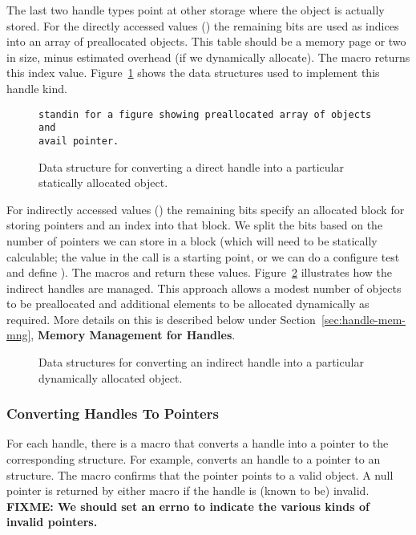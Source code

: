 \documentclass{article}
\def\fixme#1{\marginpar{FIXME:}\textbf{FIXME: #1}}
\begin{document}
The last two handle types point at other storage where the object is
actually stored.
For the directly accessed values () the
remaining bits are used as indices into 
an array of preallocated objects.
This table should be 
a memory page or two in size, 
minus estimated  overhead (if we dynamically allocate).
The macro  returns this index value.
Figure~\ref{fig:handle-direct} shows the data structures used to
implement this handle kind.

\begin{figure}
\begin{verbatim}
standin for a figure showing preallocated array of objects and
avail pointer.
\end{verbatim}
\caption{Data structure for converting a direct handle into a
particular statically allocated object.}
\label{fig:handle-direct}
\end{figure}

For indirectly accessed values () the
remaining bits specify an allocated block 
for storing pointers and an index into that block.  We split the bits
based on the number of pointers we can store in a block (which will need
to be statically calculable; the  value in the
 call is a starting point, or we can  do a configure test and
define ). 
The macros  and 
return these values.
Figure~\ref{fig:indirect} illustrates how the indirect handles are managed.
This approach allows a modest number of objects to be preallocated and
additional elements to be allocated dynamically as required.  More
details on this is described below under
Section~\ref{sec:handle-mem-mng}, \textbf{Memory Management for 
Handles}. 

\begin{figure}
\centerline{}
\caption{Data structures for converting an indirect handle into a particular
  dynamically allocated object.}
\label{fig:indirect}
\end{figure}

\subsubsection{Converting Handles To Pointers}
\label{sec:handle-to-ptr}
For each handle, there is a macro  that converts a
handle into a pointer to the corresponding structure.  For example,
 converts an  handle to a
pointer to an
 structure.  The macro  confirms
that the pointer points to a valid object.
A null pointer is returned by either macro if the handle
is (known to be) invalid.
\fixme{We should set an errno to indicate the various kinds of invalid pointers.}
\end{document}
